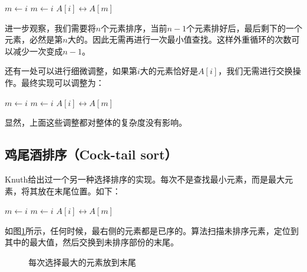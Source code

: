 \documentclass[UTF8]{article}
\begin{document}
\begin{algorithmic}[1]
    \State $m \gets i$
        \State $m \gets i$
      \EndIf
    \EndFor
    \State {} $A[i] \leftrightarrow A[m]$
  \EndFor
\EndProcedure
\end{algorithmic}

进一步观察，我们需要将$n$个元素排序，当前$n-1$个元素排好后，最后剩下的一个元素，必然是第$n$大的。因此无需再进行一次最小值查找。这样外重循环的次数可以减少一次变成$n-1$。

还有一处可以进行细微调整，如果第$i$大的元素恰好是$A[i]$，我们无需进行交换操作。最终实现可以调整为：

\begin{algorithmic}[1]
    \State $m \gets i$
        \State $m \gets i$
      \EndIf
    \EndFor
      \State {} $A[i] \leftrightarrow A[m]$
    \EndIf
  \EndFor
\EndProcedure
\end{algorithmic}

显然，上面这些调整都对整体的复杂度没有影响。

\subsection{鸡尾酒排序（Cock-tail sort）}

Knuth给出过一个另一种选择排序的实现\cite{TAOCP}。每次不是查找最小元素，而是最大元素，将其放在末尾位置。如下：

\begin{algorithmic}[1]
    \State $m \gets i$
        \State $m \gets i$
      \EndIf
    \EndFor
    \State {} $A[i] \leftrightarrow A[m]$
  \EndFor
\EndProcedure
\end{algorithmic}

如图\ref{fig:knuth-ssort}所示，任何时候，最右侧的元素都是已序的。算法扫描未排序元素，定位到其中的最大值，然后交换到未排序部份的末尾。

\begin{figure}[htbp]
  \centering
  \caption{每次选择最大的元素放到末尾}
  \label{fig:knuth-ssort}
\end{figure}
\end{document}
